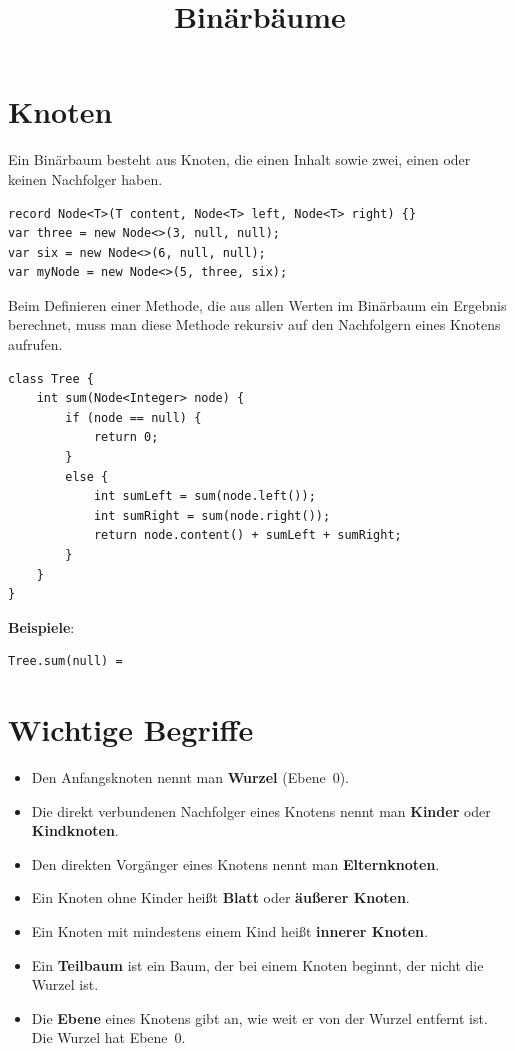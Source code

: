 \documentclass[a4paper]{scrartcl}
\date{}
\title{Binärbäume}
\begin{document}
\section{Knoten}
Ein Binärbaum besteht aus Knoten, die einen Inhalt sowie zwei, einen oder keinen Nachfolger haben.
\begin{verbatim}
record Node<T>(T content, Node<T> left, Node<T> right) {}
var three = new Node<>(3, null, null);
var six = new Node<>(6, null, null);
var myNode = new Node<>(5, three, six);
\end{verbatim}
\begin{center}
\end{center}
Beim Definieren einer Methode, die aus allen Werten im Binärbaum ein Ergebnis berechnet,
muss man diese Methode rekursiv auf den Nachfolgern eines Knotens aufrufen.
\begin{verbatim}
class Tree {
    int sum(Node<Integer> node) {
        if (node == null) {
            return 0;
        } 
        else {
            int sumLeft = sum(node.left());
            int sumRight = sum(node.right());
            return node.content() + sumLeft + sumRight;
        }
    }
}
\end{verbatim}
\textbf{Beispiele}:
\begin{verbatim}
Tree.sum(null) = 
\end{verbatim}
\pagebreak
\section{Wichtige Begriffe}
\begin{itemize}
  \item Den Anfangsknoten nennt man \textbf{Wurzel} (Ebene~0).
  \item Die direkt verbundenen Nachfolger eines Knotens nennt man \textbf{Kinder} oder \textbf{Kindknoten}.
  \item Den direkten Vorgänger eines Knotens nennt man \textbf{Elternknoten}.
  \item Ein Knoten ohne Kinder heißt \textbf{Blatt} oder \textbf{äußerer Knoten}.
  \item Ein Knoten mit mindestens einem Kind heißt \textbf{innerer Knoten}.
  \item Ein \textbf{Teilbaum} ist ein Baum, der bei einem Knoten beginnt, der nicht die Wurzel ist.
  \item Die \textbf{Ebene} eines Knotens gibt an, wie weit er von der Wurzel entfernt ist. Die Wurzel hat Ebene~0.
\end{itemize}
\end{document}
